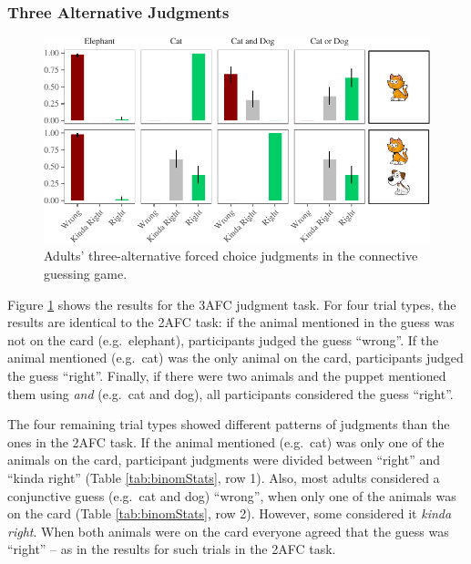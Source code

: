 \documentclass[oneside]{report}
\theoremstyle{definition}
\theoremstyle{definition}
\theoremstyle{definition}
\theoremstyle{remark}
\begin{document}
\subsubsection{Three Alternative
Judgments}\label{three-alternative-judgments}
\begin{figure}[t]

{\centering \includegraphics{figs/ternaryAdultsPlot-1} 

}

\caption{Adults' three-alternative forced choice judgments in the connective guessing game.}\label{fig:ternaryAdultsPlot}
\end{figure}
Figure \ref{fig:ternaryAdultsPlot} shows the results for the 3AFC
judgment task. For four trial types, the results are identical to the
2AFC task: if the animal mentioned in the guess was not on the card
(e.g.~elephant), participants judged the guess ``wrong''. If the animal
mentioned (e.g.~cat) was the only animal on the card, participants
judged the guess ``right''. Finally, if there were two animals and the
puppet mentioned them using \emph{and} (e.g.~cat and dog), all
participants considered the guess ``right''.

The four remaining trial types showed different patterns of judgments
than the ones in the 2AFC task. If the animal mentioned (e.g.~cat) was
only one of the animals on the card, participant judgments were divided
between ``right'' and ``kinda right'' (Table \ref{tab:binomStats}, row
1). Also, most adults considered a conjunctive guess (e.g.~cat and dog)
``wrong'', when only one of the animals was on the card (Table
\ref{tab:binomStats}, row 2). However, some considered it \emph{kinda
right}. When both animals were on the card everyone agreed that the
guess was ``right'' -- as in the results for such trials in the 2AFC
task.
\end{document}
